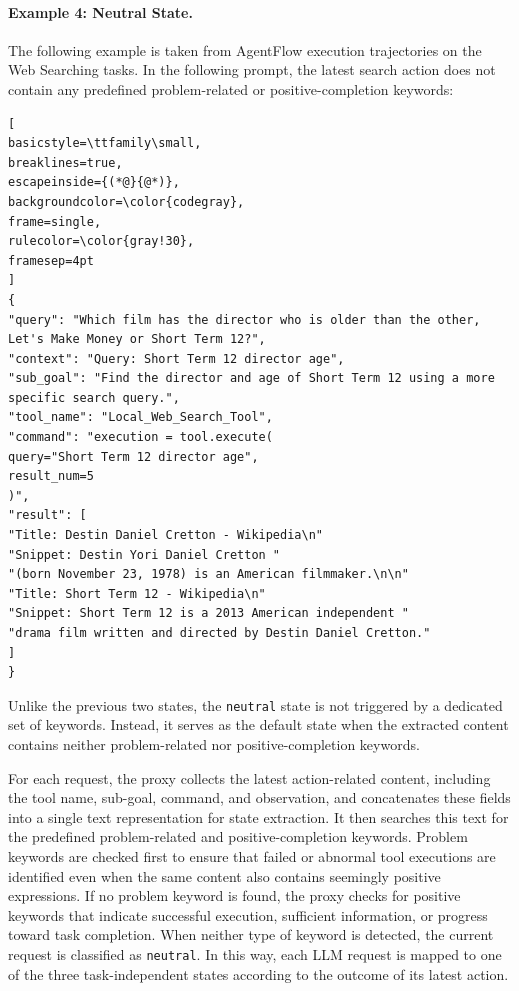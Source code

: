 \paragraph{Example 4: Neutral State.}
The following example is taken from AgentFlow execution trajectories on the Web Searching tasks.
In the following prompt, the latest search action does not contain any predefined problem-related or positive-completion keywords:

\begin{lstlisting}[
basicstyle=\ttfamily\small,
breaklines=true,
escapeinside={(*@}{@*)},
backgroundcolor=\color{codegray},
frame=single,
rulecolor=\color{gray!30},
framesep=4pt
]
{
"query": "Which film has the director who is older than the other, Let's Make Money or Short Term 12?",
"context": "Query: Short Term 12 director age",
"sub_goal": "Find the director and age of Short Term 12 using a more specific search query.",
"tool_name": "Local_Web_Search_Tool",
"command": "execution = tool.execute(
query="Short Term 12 director age",
result_num=5
)",
"result": [
"Title: Destin Daniel Cretton - Wikipedia\n"
"Snippet: Destin Yori Daniel Cretton "
"(born November 23, 1978) is an American filmmaker.\n\n"
"Title: Short Term 12 - Wikipedia\n"
"Snippet: Short Term 12 is a 2013 American independent "
"drama film written and directed by Destin Daniel Cretton."
]
}
\end{lstlisting}

Unlike the previous two states, the \texttt{neutral} state is not
triggered by a dedicated set of keywords. Instead, it serves as the
default state when the extracted content contains neither
problem-related nor positive-completion keywords. 

For each request, the proxy collects the latest action-related content, including the tool name, sub-goal, command, and observation, and concatenates these fields into a single text representation for state extraction. It then searches this text for the predefined problem-related and positive-completion keywords. Problem keywords are checked first to ensure that failed or abnormal tool executions are identified even when the same content also contains seemingly positive expressions. If no problem keyword is found, the proxy checks for positive keywords that indicate successful execution, sufficient information, or progress toward task completion. When neither type of keyword is detected, the current request is classified as \texttt{neutral}. In this way, each LLM request is mapped to one of the three task-independent states according to the outcome of its latest action.

